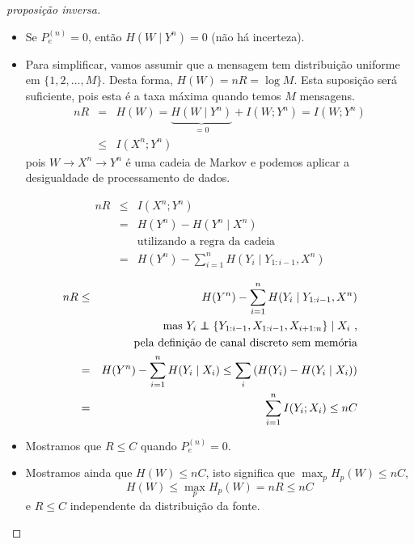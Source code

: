\begin{frame}[allowframebreaks]
\begin{proof}[proposição inversa]
  \proofbreak

  \begin{itemize}
  \item Se $P_e^{(n)} = 0$, então $H(W \mid Y^n) = 0$ (não há incerteza).
  \item Para simplificar, vamos assumir que a mensagem tem distribuição uniforme em $\{1, 2, \ldots, M\}$.
	Desta forma, $H(W) = nR = \log M$. Esta suposição será suficiente, pois esta é a taxa máxima quando temos $M$ mensagens.
	\begin{eqnarray}
	nR &=& H(W) = \underbrace{H(W \mid Y^n)}_{=0} + I(W;Y^n) = I(W;Y^n) \nonumber \\
		&\leq& I(X^n;Y^n)
	\end{eqnarray}
	pois $W \rightarrow X^n \rightarrow Y^n$ é uma cadeia de Markov e podemos aplicar a desigualdade de processamento de dados.
  \end{itemize}
  
  \proofbreak

	\vspace{-0.75cm}
       \begin{eqnarray} 
	nR &\leq& I(X^n;Y^n) \nonumber \\
		&=& H(Y^n) - H(Y^n \mid X^n) \nonumber \\
		&& \text{utilizando a regra da cadeia} \nonumber \\
		&=& H(Y^n) - \sum_{i=1}^{n} H(Y_i \mid Y_{1:i-1}, X^n) 
	\end{eqnarray}

  \proofbreak

	\begin{eqnarray} 
        nR &\leq& H(Y^n) - \sum_{i=1}^{n} H(Y_i \mid Y_{1:i-1}, X^n) \nonumber \\
		&& \text{mas $Y_i \independent \{ Y_{1:i-1}, X_{1:i-1}, X_{i+1:n} \} \mid X_i$ ,} \nonumber \\
		&& \text{pela definição de canal discreto sem memória} \nonumber \\
		&=& H(Y^n)  - \sum_{i=1}^{n} H(Y_i \mid X_i) \leq \sum_{i} \left( H(Y_i) - H(Y_i \mid X_i) \right) \nonumber \\
		&=& \sum_{i=1}^{n} I(Y_i;X_i) \leq nC
	 \end{eqnarray}

  \proofbreak

  \begin{itemize}
  \item Mostramos que $R \leq C$ quando $P_e^{(n)} = 0$.
  \item Mostramos ainda que $H(W) \leq nC$, isto significa que $\max_p H_p(W) \leq nC$,
	\begin{equation}
	H(W) \leq \max_p H_p(W) = nR \leq nC
	\end{equation}
	e $R \leq C$ independente da distribuição da fonte.
  \end{itemize}
  \end{proof}


\end{frame}
